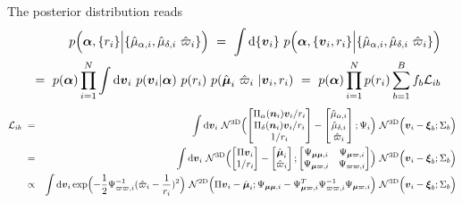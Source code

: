 \documentclass{article}
\renewcommand{\d}{{\mathrm{d}}}
\newcommand{\eqn}[1]{\begin{eqnarray}#1\end{eqnarray}}
\renewcommand{\vec}[1]{\boldsymbol{#1}}
\begin{document}
The posterior distribution reads
\eqn{
	&&p\Bigl(\vec{\alpha}, \{ r_i \} \Bigl\vert \{\hat{\mu}_{\alpha, i}, \hat{\mu}_{\delta, i} \ \hat{\varpi}_i  \} \Bigr) \ = \ \int\d\{ \vec{v}_i\} \ p\Bigl(\vec{\alpha}, \{\vec{v}_i,  r_i \} \Bigl\vert \{\hat{\mu}_{\alpha, i}, \hat{\mu}_{\delta, i} \ \hat{\varpi}_i  \} \Bigr) \nonumber\\ 
	&&= \ p( \vec{\alpha} ) \prod_{i=1}^N \int\d \vec{v}_i \ p(\vec{v}_i \vert \vec{\alpha} ) \ p(r_i) \ p( \hat{\vec{\mu}}_i \ \hat{\varpi}_i \ \vert \vec{v}_i, r_i)  \ =	\ p( \vec{\alpha} ) \prod_{i=1}^N  p(r_i )  \sum_{b=1}^B  f_b  \mathcal{L}_{ib} \nonumber
}
\eqn{
	 \mathcal{L}_{ib} \ &=& \  \int\d \vec{v}_i \ \mathcal{N}^\mathrm{3D}\Bigl(
	 \begin{bmatrix} 
		\Pi_\alpha(\vec{n}_i) \vec{v}_i / r_i	\\ 
		\Pi_\delta(\vec{n}_i) \vec{v}_i / r_i	\\ 
		1/r_i	
	\end{bmatrix} -
	 \begin{bmatrix} \hat{\mu}_{\alpha, i}\\ \hat{\mu}_{\delta, i} \\ \hat{\varpi}_i \end{bmatrix} ; \Psi_i \Bigr) 
	\ \mathcal{N}^\mathrm{3D}\Bigl(  \vec{v}_i  - \vec{\xi}_b; \Sigma_b\Bigr)
	\\  
	&=& \  \int\d \vec{v}_i \ \mathcal{N}^\mathrm{3D}\Bigl(
	 \begin{bmatrix} 
		 \Pi\vec{v}_i 	\\ 
		1/r_i	
	\end{bmatrix} -
	 \begin{bmatrix} \hat{\vec{\mu}}_i \\ \hat{\varpi}_i \end{bmatrix} ; 
	  \begin{bmatrix}
	  	\Psi_{\vec{\mu}\vec{\mu}, i} & \Psi_{\vec{\mu}\varpi, i}\\
	  	\Psi_{\vec{\mu}\varpi, i}	& \Psi_{\varpi\varpi, i}
	   \end{bmatrix} \Bigr) 
	\ \mathcal{N}^\mathrm{3D}\Bigl(  \vec{v}_i  - \vec{\xi}_b; \Sigma_b\Bigr)  
	\nonumber \\
	&\propto&  \int\d \vec{v}_i \exp\Bigl( -\frac{1}{2} \Psi^{-1}_{\varpi\varpi, i} (\hat{\varpi}_i-\frac{1}{r_i})^2 \Bigr) \ 
	\mathcal{N}^\mathrm{2D}\Bigl(   \Pi\vec{v}_i  - \hat{\vec{\mu}}_i; \Psi_{\vec{\mu}\vec{\mu}, i} - \Psi^T_{\vec{\mu}\varpi, i}\Psi^{-1}_{\varpi\varpi, i} \Psi_{\vec{\mu}\varpi, i}\Bigr)   \ \mathcal{N}^\mathrm{3D}\Bigl(  \vec{v}_i  - \vec{\xi}_b; \Sigma_b\Bigr)  \\
}
\end{document}
